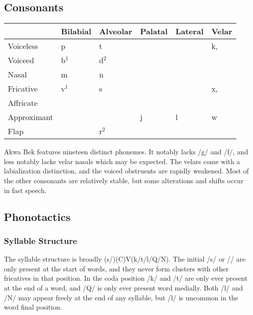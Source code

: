\documentclass[11pt,letterpaper]{article}
\newcommand{\tx}{\textipa{S}}
\newcommand{\tj}{\textipa{\textbeltl}}
\newcommand{\tz}{\textipa{\t{ts}}}
\newcommand{\tc}{\textipa{\t{t\tx}}}
\newcommand{\tq}{\textipa{\t{t\tj}}}
\newcommand{\tkw}{\textipa{k\super w}}
\newcommand{\txw}{\textipa{x\super w}}
\begin{document}
  \subsection{Consonants}
  \label{consonants}
       \begin{tabular}{|l|l|l|l|l|l|}
         \hline
                     & Bilabial   & Alveolar & Palatal & Lateral & Velar     \\ \hline \hline
         Voiceless   & p          & t        &         &         & k, \tkw   \\
         Voiceed     & b$^1$      & d$^2$    &         &         &           \\
         Nasal       & m          & n        &         &         &           \\
         Fricative   & v$^1$      & s        & \tx     &  \tj    & x, \txw   \\
         Affricate   &            & \tz      & \tc     &  \tq    &           \\
         Approximant &            &          & j       &  l      & w         \\ 
         Flap        &            & r$^2$    &         &         &           \\ \hline
       \end{tabular}
     \vspace{5mm}
     \par
     Akwa Bek features nineteen distinct phonemes. It notably lacks /g/ and /f/, and less notably lacks velar nasals which may be expected. The velars come with a labialization distinction, and the voiced obstruents are rapidly weakened. Most of the other consonants are relatively stable, but some alterations and shifts occur in fast speech.

  \subsection{Phonotactics}
  \label{phonotactics}

    \subsubsection{Syllable Structure}
    \label{syllables}
    The syllable structure is broadly (s/\tx)(C)V(k/t/l/Q/N). The initial /s/ or /\tx/ are only present at the start of words, and they never form clusters with other fricatives in that position. In the coda position /k/ and /t/ are only ever present at the end of a word, and /Q/ is only ever present word medially. Both /l/ and /N/ may appear freely at the end of any syllable, but /l/ is uncommon in the word final position.
\end{document}
